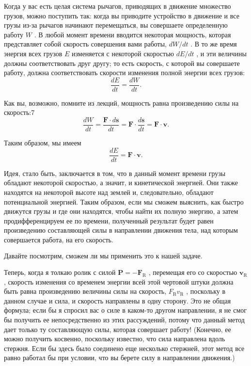 \documentclass[11pt,oneside]{article}
\providecommand{\ddt}[2]{\frac{d#1}{d#2}}
\providecommand{\FLPF}{\mathbf{F}}
\providecommand{\FLPP}{\mathbf{P}}
\providecommand{\FLPs}{\mathbf{s}}
\providecommand{\FLPv}{\mathbf{v}}
\begin{document}
Когда у вас есть целая система рычагов, приводящих в движение множество грузов, можно поступить так: когда вы приводите устройство в движение и все грузы из-за рычагов начинают перемещаться, вы совершаете определенную работу \(W\) . В любой момент времени вводится некоторая мощность, которая представляет собой скорость совершения вами работы, \(dW/dt\) . В то же время энергия всех грузов \(E\) изменяется с некоторой скоростью \(dE/dt\) , и эти величины должны соответствовать друг другу; то есть скорость, с которой вы совершаете работу, должна соответствовать скорости изменения полной энергии всех грузов: 
\begin{equation*} \tag{2.21}
\label{Eq:TIPS:2:21} \ddt{E}{t} = \ddt{W}{t}. \end{equation*}
\par

Как вы, возможно, помните из лекций, мощность равна произведению силы на скорость:7 
\begin{equation*} \tag{2.22}
\label{Eq:TIPS:2:22} \ddt{W}{t} =\frac{\FLPF\cdot d\FLPs}{dt} = \FLPF\cdot\ddt{\FLPs}{t} = \FLPF\cdot\FLPv. \end{equation*}
\par

Таким образом, мы имеем 
\begin{equation*} \tag{2.23}
\label{Eq:TIPS:2:23} \ddt{E}{t} = \FLPF\cdot\FLPv. \end{equation*}
\par

Идея, стало быть, заключается в том, что в данный момент времени грузы обладают некоторой скоростью, а значит, и кинетической энергией. Они также находятся на некоторой высоте над землей и, следовательно, обладают потенциальной энергией. Таким образом, если мы сможем выяснить, как быстро движутся грузы и где они находятся, чтобы найти их полную энергию, а затем продифференцируем ее по времени, полученный результат будет равен произведению составляющей силы в направлении движения тела, над которым совершается работа, на его скорость.\par

Давайте посмотрим, сможем ли мы применить это к нашей задаче.\par

Теперь, когда я толкаю ролик с силой \(\FLPP = -\FLPF_\text{R}\) , перемещая его со скоростью \(\FLPv_\text{R}\) , скорость изменения со временем энергии всей этой чертовой штуки должна быть равна произведению величины силы на скорость, \(F_\text{R}v_\text{R}\) , поскольку в данном случае и сила, и скорость направлены в одну сторону. Это не общая формула; если бы я спросил вас о силе в каком-то другом направлении, я не смог бы получить ее непосредственно из этих рассуждений, потому что данный метод дает только ту составляющую силы, которая совершает работу! (Конечно, ее можно получить косвенно, поскольку известно, что сила направлена вдоль стержня. Если бы здесь было соединено еще несколько стержней, этот метод все равно работал бы при условии, что вы берете силу в направлении движения.)\par
\end{document}

